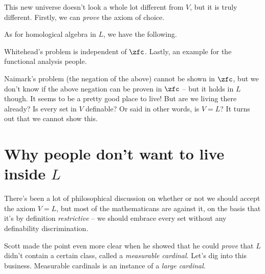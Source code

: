 
This new universe doesn't look a whole lot different from $V$, but it is truly different. Firstly, we can \textit{prove} the axiom of choice. 


As for homological algebra in $L$, we have the following.


Whitehead's problem is independent of $\zfc$. Lastly, an example for the functional analysis people.


Naimark's problem (the negation of the above) cannot be shown in $\zfc$, but we don't know if the above negation can be proven in $\zfc$ -- but it holds in $L$ though. It seems to be a pretty good place to live! But are we living there already? Is every set in $V$ definable? Or said in other words, is $V=L$? It turns out that we cannot show this.


\section{Why people don't want to live inside $L$}
There's been a lot of philosophical discussion on whether or not we should accept the axiom $V=L$, but most of the mathematicans are against it, on the basis that it's by definition \textit{restrictive} -- we should embrace every set without any definability discrimination.

\qquad Scott made the point even more clear when he showed that he could \textit{prove} that $L$ didn't contain a certain class, called a \textit{measurable cardinal}. Let's dig into this business. Measurable cardinals is an instance of a \textit{large cardinal}.

